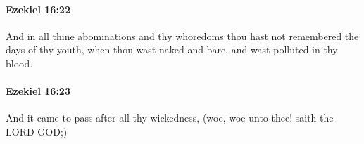 		\paragraph{Ezekiel 16:22} %
			\label{EZEKIEL-16-22}

			And in all thine abominations and thy whoredoms thou hast not remembered the days of thy youth, when thou wast naked and bare, and wast polluted in thy blood.


		\paragraph{Ezekiel 16:23} %
			\label{EZEKIEL-16-23}

			And it came to pass after all thy wickedness, (woe, woe unto thee! saith the LORD GOD;)


